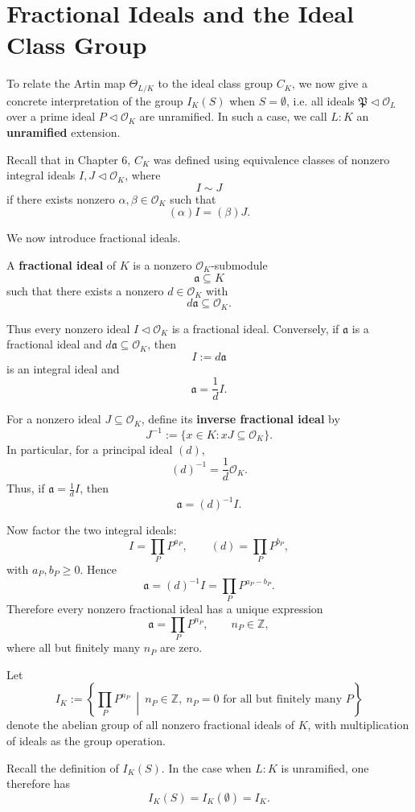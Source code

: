 \section{Fractional Ideals and the Ideal Class Group}
To relate the Artin map $\Theta_{L/K}$ to the ideal class group $C_K$, we now give a concrete interpretation of
the group $I_K(S)$ when $S = \emptyset$, i.e. all ideals $\mathfrak P \lhd \mathcal O_L$ over a prime ideal $P \lhd \mathcal O_K$ are unramified. In such a case, we call $L:K$ an {\bf unramified} extension.

Recall that in Chapter 6, $C_K$ was defined using equivalence classes of nonzero integral ideals
$I,J\lhd \mathcal O_K$, where
\[
I\sim J
\]
if there exists nonzero $\alpha,\beta\in\mathcal O_K$ such that
\[
(\alpha)I=(\beta)J.
\]

We now introduce fractional ideals.

\begin{definition}
A {\bf fractional ideal} of $K$ is a nonzero $\mathcal O_K$-submodule
\[
\mathfrak a\subseteq K
\]
such that there exists a nonzero $d\in\mathcal O_K$ with
\[
d\mathfrak a\subseteq\mathcal O_K.
\]
\end{definition}

Thus every nonzero ideal $I \lhd \mathcal O_K$ is a fractional ideal. Conversely, if $\mathfrak a$ is a fractional ideal and
$d\mathfrak a\subseteq\mathcal O_K$, then
\[
I:=d\mathfrak a
\]
is an integral ideal and
\[
\mathfrak a=\frac1d I.
\]

For a nonzero ideal $J\subseteq\mathcal O_K$, define its {\bf inverse fractional ideal} by
\[
J^{-1}:=\{x\in K:xJ\subseteq\mathcal O_K\}.
\]
In particular, for a principal ideal $(d)$,
\[
(d)^{-1}=\frac1d\mathcal O_K.
\]
Thus, if $\mathfrak a=\frac1d I$, then
\[
\mathfrak a=(d)^{-1}I.
\]

Now factor the two integral ideals:
\[
I=\prod_P P^{a_P},
\qquad
(d)=\prod_P P^{b_P},
\]
with $a_P,b_P\geq0$. Hence
\[
\mathfrak a
=(d)^{-1}I
=\prod_P P^{a_P-b_P}.
\]
Therefore every nonzero fractional ideal has a unique expression
\[
\mathfrak a=\prod_P P^{n_P},
\qquad n_P\in\mathbb Z,
\]
where all but finitely many $n_P$ are zero.


\begin{definition}
Let 
$$I_K := \left\{\prod_P P^{n_P}\ \middle|\ n_P\in\mathbb Z,\ n_P=0\text{ for all but finitely many }P\right\}$$
denote the abelian group of all nonzero fractional ideals of $K$, with multiplication of ideals as the group operation.
\end{definition}
Recall the definition of $I_K(S)$. In the case when $L:K$ is unramified, one therefore has
$$I_K(S) = I_K(\emptyset) = I_K.$$

